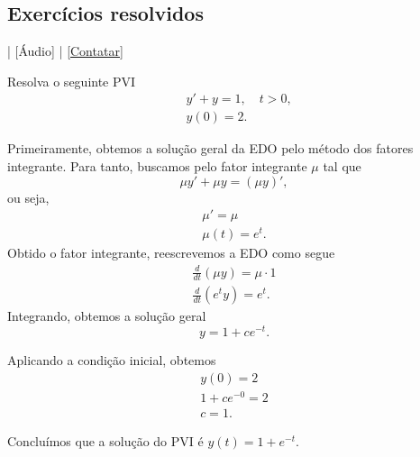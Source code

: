 \subsection*{Exercícios resolvidos}

\begin{flushright}
  [Vídeo] | [Áudio] | \href{https://phkonzen.github.io/notas/contato.html}{[Contatar]}
\end{flushright}

\begin{exeresol}
  Resolva o seguinte PVI
  \begin{align}
    &y' + y = 1, \quad t>0,\\
    &y(0) = 2.
  \end{align}
\end{exeresol}
\begin{resol}
  Primeiramente, obtemos a solução geral da EDO pelo método dos fatores integrante. Para tanto, buscamos pelo fator integrante $\mu$ tal que
  \begin{equation}
    \mu y' + \mu y = (\mu y)',
  \end{equation}
  ou seja,
  \begin{gather}
    \mu' = \mu \\
    \mu(t) = e^{t}.
  \end{gather}
  Obtido o fator integrante, reescrevemos a EDO como segue
  \begin{gather}
    \frac{d}{dt}\left(\mu y\right) = \mu\cdot 1 \\
    \frac{d}{dt}\left(e^ty\right) = e^t.
  \end{gather}
  Integrando, obtemos a solução geral
  \begin{equation}
    y = 1 + ce^{-t}.
  \end{equation}

  Aplicando a condição inicial, obtemos
  \begin{gather}
    y(0) = 2 \\
    1 + ce^{-0} = 2 \\
    c = 1.
  \end{gather}

  Concluímos que a solução do PVI é $y(t) = 1 + e^{-t}$.
\end{resol}

